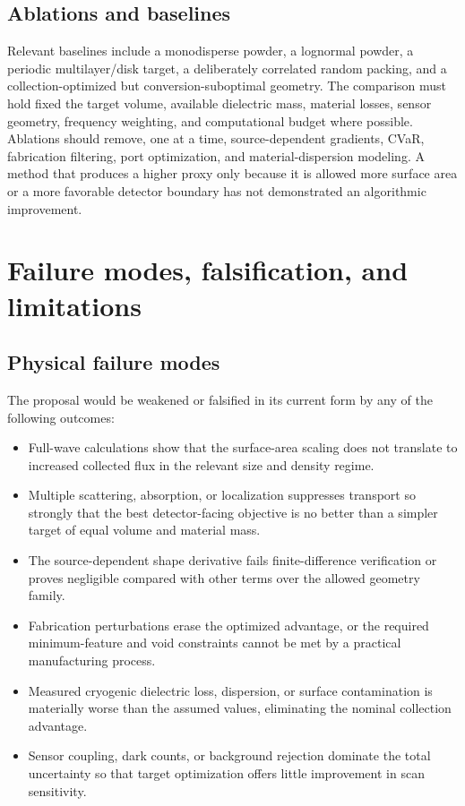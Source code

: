 \documentclass[10.5pt,a4paper]{article}
\begin{document}
\subsection{Ablations and baselines}
Relevant baselines include a monodisperse powder, a lognormal powder, a periodic multilayer/disk target, a deliberately correlated random packing, and a collection-optimized but conversion-suboptimal geometry. The comparison must hold fixed the target volume, available dielectric mass, material losses, sensor geometry, frequency weighting, and computational budget where possible. Ablations should remove, one at a time, source-dependent gradients, CVaR, fabrication filtering, port optimization, and material-dispersion modeling. A method that produces a higher proxy only because it is allowed more surface area or a more favorable detector boundary has not demonstrated an algorithmic improvement.

\section{Failure modes, falsification, and limitations}
\subsection{Physical failure modes}
The proposal would be weakened or falsified in its current form by any of the following outcomes:
\begin{itemize}
\item Full-wave calculations show that the surface-area scaling does not translate to increased collected flux in the relevant size and density regime.
\item Multiple scattering, absorption, or localization suppresses transport so strongly that the best detector-facing objective is no better than a simpler target of equal volume and material mass.
\item The source-dependent shape derivative fails finite-difference verification or proves negligible compared with other terms over the allowed geometry family.
\item Fabrication perturbations erase the optimized advantage, or the required minimum-feature and void constraints cannot be met by a practical manufacturing process.
\item Measured cryogenic dielectric loss, dispersion, or surface contamination is materially worse than the assumed values, eliminating the nominal collection advantage.
\item Sensor coupling, dark counts, or background rejection dominate the total uncertainty so that target optimization offers little improvement in scan sensitivity.
\end{itemize}
\end{document}
